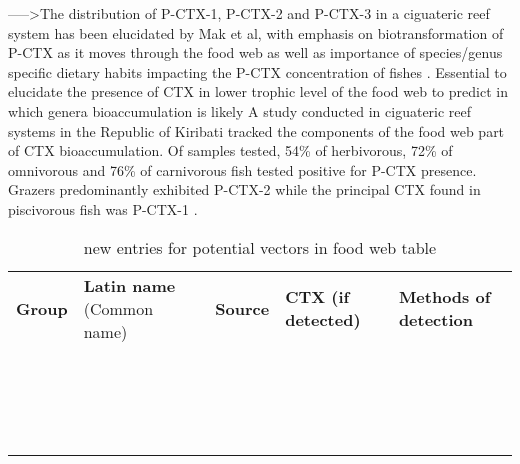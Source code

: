 \documentclass[12pt]{article}
\begin{document}
----->The distribution of P-CTX-1, P-CTX-2 and P-CTX-3 in a ciguateric reef system has been elucidated by Mak et al, with emphasis on biotransformation of P-CTX as it moves through the food web as well as importance of species/genus specific dietary habits impacting the P-CTX concentration of fishes \cite{mak2013pacific}.
Essential to elucidate the presence of CTX in lower trophic level of the food web to predict in which genera bioaccumulation is likely \cite{mak2013pacific}
A study conducted in ciguateric reef systems in the Republic of Kiribati tracked the components of the food web part of CTX bioaccumulation. Of samples tested, 54\% of herbivorous, 72\% of omnivorous and 76\% of carnivorous fish tested positive for P-CTX presence. Grazers predominantly exhibited P-CTX-2 while the principal CTX found in piscivorous fish was P-CTX-1 \cite{mak2013pacific}.

\begin{table}
\caption{new entries for potential vectors in food web table}
\begin{tabular}{ p{2cm} p{3cm}  p{4.5cm}  p{2cm}  p{3cm}  }
\textbf{Group} & \textbf{Latin name} (Common name) & \textbf{Source} & \textbf{CTX (if detected)} & \textbf{Methods of detection} \\
  &  \emph{} &  &  & \\
  & \emph{}  &  &  & \\
  & \emph{} &  &  & \\
  &  \emph{} &  &  & \\
  & \emph{}  &  &  & \\
  & \emph{} &  &  & \\
  &  \emph{} &  &  & \\
  & \emph{}  &  &  & \\
  & \emph{} &  &  & \\
  &  \emph{} &  &  & \\
  & \emph{}  &  &  & \\
  & \emph{} &  &  & \\
  &  \emph{} &  &  & \\
  & \emph{}  &  &  & \\
  & \emph{} &  &  & \\
  &  \emph{} &  &  & \\
  & \emph{}  &  &  & \\
  & \emph{} &  &  & \\
\end{tabular}
\end{table}
\end{document}
